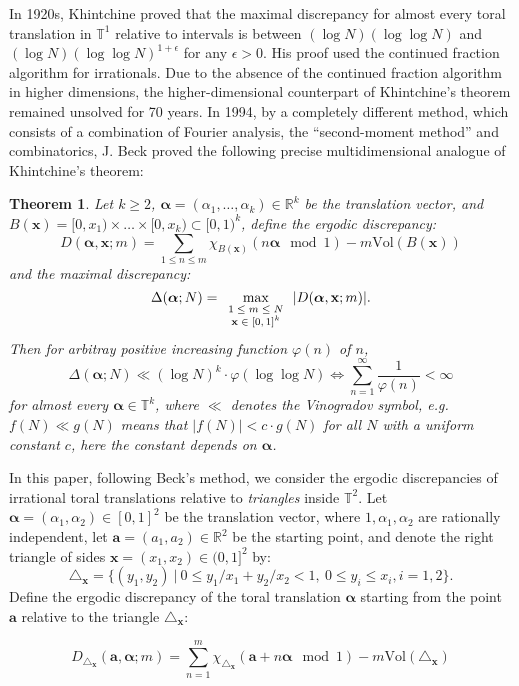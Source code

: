 \documentclass[11pt]{article}
\newtheorem{thm}{Theorem}[section]
\newcommand{\beq}{\begin{equation}}
\newcommand{\eeq}{\end{equation}}
\newcommand{\fc}{\frac}
\newcommand{\T}{\mathbb{T}}
\newcommand{\R}{\mathbb{R}}
\renewcommand{\a}{\alpha}
\newcommand{\e}{\epsilon}
\renewcommand{\(}{\left(}
\renewcommand{\)}{\right)}
\renewcommand{\bf}{\mathbf}
\newcommand{\Vol}{\text{Vol}}
\newcommand{\bma}{\bm{\alpha}}
\newcommand{\<}{\langle}
\renewcommand{\>}{\rangle}
\begin{document}
In 1920s, Khintchine \cite{Khintchine} proved that the maximal discrepancy for almost every toral translation in $\T^1$ relative to intervals is between $(\log N)(\log\log N)$ and $(\log N)(\log \log N)^{1+\e}$ for any $\e>0$. His proof used the continued fraction algorithm for irrationals. Due to the absence of the continued fraction algorithm in higher dimensions, the higher-dimensional counterpart of Khintchine's theorem remained unsolved for 70 years. In 1994, by a completely different method, which consists of a combination of Fourier analysis, the ``second-moment method'' and combinatorics, J. Beck\cite{Beck} proved the following precise multidimensional analogue of Khintchine's theorem:
\begin{thm}
Let $k\ge 2$, $\bm{\a}=(\a_1,\dots, \a_k)\in \R^k$ be the translation vector, and $B(\bf{x})=[0, x_1)\times \dots \times [0,x_k)\subset [0,1)^k$, define the ergodic discrepancy:
$$
D(\bm{\a}, \bf{x}; m)=\sum_{1\le n\le m} \chi_{B(\bf{x})}(n\bm{\a}\mod 1)-m\Vol(B(\bf{x}))
$$
and the maximal discrepancy:
$$
\Delta(\bm{\a}; N)= \max_{\mbox{\scriptsize$\begin{array}{c}
1\le m \le N \\
\bf{x}\in [0,1]^k\\\end{array}$}} |D(\bm{\a}, \bf{x}; m)|.
$$
Then for arbitray positive increasing function $\varphi(n)$ of $n$, 
\beq\label{Thm of Beck}
\Delta(\bm{\a}; N)\ll (\log N)^k\cdot \varphi(\log \log N) \Longleftrightarrow \sum_{n=1}^\infty \fc{1}{\varphi(n)}<\infty
\eeq
for almost every $\bm{\a}\in \T^k$, where $\ll$ denotes the Vinogradov symbol, e.g. $f(N)\ll g(N)$ means that $|f(N)|<c \cdot g(N)$ for all $N$ with a uniform constant $c$, here the constant depends on $\bma$.
\end{thm}

In this paper, following Beck's method, we consider the ergodic discrepancies of irrational toral translations relative to \emph{triangles} inside $\T^2$. Let $\bm{\a}=(\a_1,\a_2)\in[0,1]^2$ be the translation vector, where $1,\a_1,\a_2$ are rationally independent, let $\bm{a}=(a_1,a_2)\in\R^2$ be the starting point, and denote the right triangle of sides $\bf{x}=(x_1,x_2)\in (0,1]^2$ by: 
\beq\label{Definition of the triangle x}
\triangle_{\bf{x}}=\{(y_1,y_2)\ | \ 0\le y_1/x_1+y_2/x_2 <1, \ 0\le y_i\le x_i, i=1,2\}.
\eeq
Define the ergodic discrepancy of the toral translation $\bm{\a}$ starting from the point $\bm{a}$ relative to the triangle $\triangle_{\bf{x}}$:

$$D_{\triangle_{\bf{x}}} (\bm{a},\bm{\a};m) = \sum\limits_{n=1}^{m}  \chi_{\triangle_{\bf{x}}}(\bm{a}+n\bm{\alpha} \mod 1)- m\text{Vol}(\triangle_{\bf{x}})$$
\end{document}
